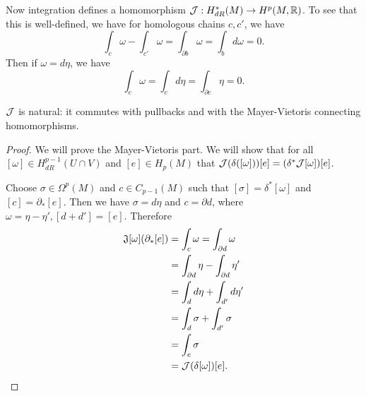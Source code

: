 \documentclass[twoside, 10pt]{article}
\begin{document}
    Now integration defines a homomorphism $\mathcal{J}: H^*_{dR}(M) \to H^p(M,
    \mathbb{R})$. To see that this is well-defined, we have for homologous chains $c,
    c'$, we have \[ \int_c \omega - \int_{c'} \omega = \int_{\partial b} \omega
    = \int_b d\omega = 0.\] Then if $\omega = d\eta$, we have \[\int_c \omega =
\int_c d\eta = \int_{\partial c} \eta = 0.\]

    \begin{lem} $\mathcal{J}$ is natural: it commutes with pullbacks and with the
    Mayer-Vietoris connecting homomorphisms.  \end{lem}

    \begin{proof} We will prove the Mayer-Vietoris part. We will show that for
        all $[\omega] \in H^{p-1}_{dR}(U \cap V)$ and $[e] \in H_p(M)$ that
        $\mathcal{J}(\delta([\omega]))[e] = ( \delta^*\mathcal{J}[\omega] )[e]$.

        Choose $\sigma \in \Omega^p(M)$ and $c \in C_{p-1}(M)$ such that
        $[\sigma] = \delta^*[\omega]$ and $[c] = \partial_*[e]$. Then we have
        $\sigma = d\eta$ and $c = \partial d$, where $\omega = \eta - \eta',
        [d+d'] = [e]$. Therefore \begin{align*} \mathfrak{J}[\omega](\partial_* [e])
        &= \int_c \omega = \int_{\partial d} \omega \\ &= \int_{\partial d}
            \eta - \int_{\partial d} \eta' \\ &= \int_d d\eta + \int_{d'}
            d\eta' \\ &= \int_d \sigma + \int_{d'} \sigma \\ &= \int_e \sigma
                   \\ &= \mathcal{J}(\delta[\omega])[e]. \qedhere \end{align*}
               \end{proof}
\end{document}
